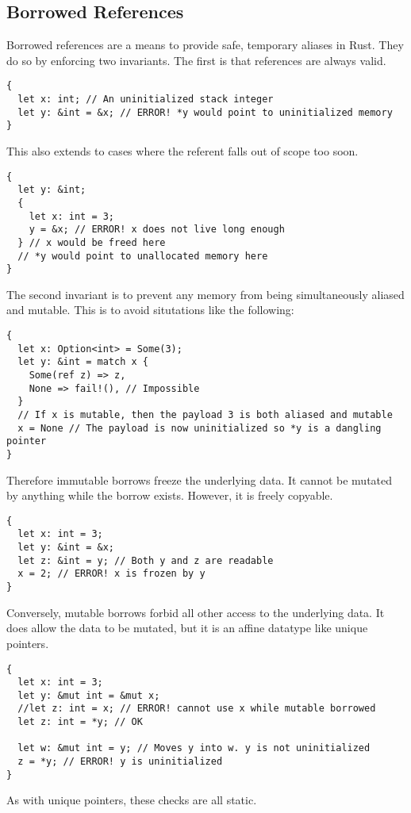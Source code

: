 \subsection*{Borrowed References}
Borrowed references are a means to provide safe, temporary aliases in Rust.
They do so by enforcing two invariants.
The first is that references are always valid.
\begin{verbatim}
{
  let x: int; // An uninitialized stack integer
  let y: &int = &x; // ERROR! *y would point to uninitialized memory
}
\end{verbatim}
This also extends to cases where the referent falls out of scope too soon.
\begin{verbatim}
{
  let y: &int;
  {
    let x: int = 3;
    y = &x; // ERROR! x does not live long enough
  } // x would be freed here
  // *y would point to unallocated memory here
}
\end{verbatim}
The second invariant is to prevent any memory from being simultaneously aliased and mutable.
This is to avoid situtations like the following:
\begin{verbatim}
{
  let x: Option<int> = Some(3);
  let y: &int = match x {
    Some(ref z) => z,
    None => fail!(), // Impossible
  }
  // If x is mutable, then the payload 3 is both aliased and mutable
  x = None // The payload is now uninitialized so *y is a dangling pointer
}
\end{verbatim}
Therefore immutable borrows freeze the underlying data.
It cannot be mutated by anything while the borrow exists.
However, it is freely copyable.
\begin{verbatim}
{
  let x: int = 3;
  let y: &int = &x;
  let z: &int = y; // Both y and z are readable
  x = 2; // ERROR! x is frozen by y
}
\end{verbatim}
Conversely, mutable borrows forbid all other access to the underlying data.
It does allow the data to be mutated, but it is an affine datatype like unique pointers.
\begin{verbatim}
{
  let x: int = 3;
  let y: &mut int = &mut x;
  //let z: int = x; // ERROR! cannot use x while mutable borrowed
  let z: int = *y; // OK

  let w: &mut int = y; // Moves y into w. y is not uninitialized
  z = *y; // ERROR! y is uninitialized
}
\end{verbatim}
As with unique pointers, these checks are all static.

